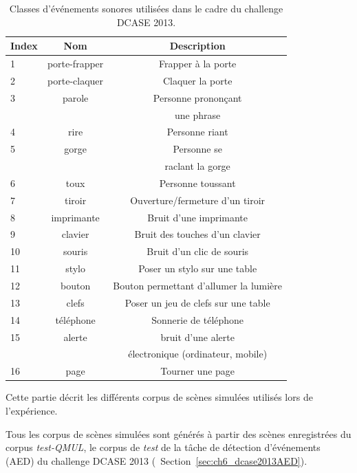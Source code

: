 \begin{table}[t]
\begin{center}
\begin{tabular}{lcc}
\textbf{Index} & \textbf{Nom}  & \textbf{Description}  \\ 
\hline
1   & porte-frapper & Frapper à la porte \\
2   & porte-claquer & Claquer la porte \\
3   & parole        & Personne prononçant \\
    &               &  une phrase \\
4   & rire          & Personne riant  \\    
5   & gorge         & Personne se   \\
    &               & raclant la gorge \\
6   & toux          & Personne toussant \\
7   & tiroir        & Ouverture/fermeture d'un tiroir \\
8   & imprimante    & Bruit d'une imprimante \\
9   & clavier       & Bruit des touches d'un clavier \\
10  & souris        & Bruit d'un clic de souris \\
11  & stylo         & Poser un stylo sur une table \\
12  & bouton        & Bouton permettant d'allumer la lumière \\
13  & clefs         & Poser un jeu de clefs sur une table \\    
14  & téléphone     & Sonnerie de téléphone \\
15  & alerte        & bruit d'une alerte \\
    &               & électronique (ordinateur, mobile) \\
16  & page          & Tourner une page \\     
\hline      
\end{tabular}
\end{center}
\caption{Classes d'événements sonores utilisées dans le cadre du challenge DCASE 2013.}
\label{tab:eventDCASE2013}
\end{table}

Cette partie décrit les différents corpus de scènes simulées utilisés lors de l'expérience. 

Tous les corpus de scènes simulées sont générés à partir des scènes enregistrées du corpus \emph{test-QMUL}, le corpus de \emph{test} de la tâche de détection d'événements (AED) du challenge DCASE 2013  \citep{giannoulis2013detection} (\cf~Section~\ref{sec:ch6_dcase2013AED}). 

